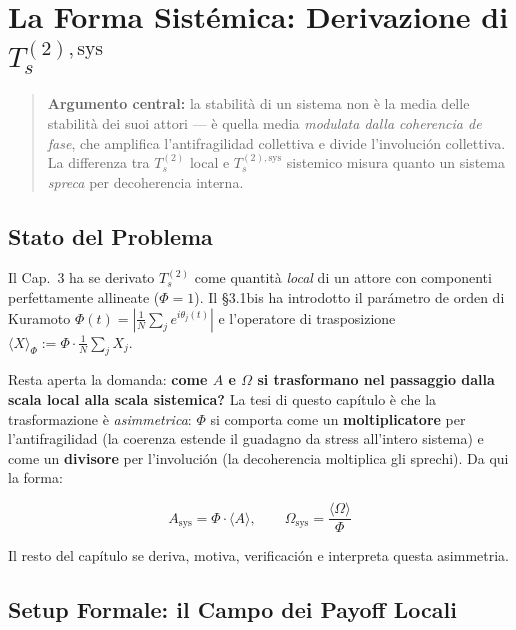 \chapter{\texorpdfstring{La Forma Sistémica: Derivazione di
\(T_s^{(2),\text{sys}}\)}{La Forma Sistémica: Derivazione di T\_s\^{}\{(2),\textbackslash text\{sys\}\}}}\label{la-forma-sistemica-se derivazione-di-t_s2textsys}

\begin{quote}
\textbf{Argumento central:} la stabilità di un sistema non è la media
delle stabilità dei suoi attori --- è quella media \emph{modulata dalla
coherencia de fase}, che amplifica l'antifragilidad collettiva e divide
l'involución collettiva. La differenza tra \(T_s^{(2)}\) local e
\(T_s^{(2),\text{sys}}\) sistemico misura quanto un sistema
\emph{spreca} per decoherencia interna.
\end{quote}



\section{Stato del Problema}\label{stato-del-problema}

Il Cap.~3 ha se derivato \(T_s^{(2)}\) come quantità \emph{local} di un
attore con componenti perfettamente allineate (\(\Phi = 1\)). Il \S{}3.1bis
ha introdotto il parámetro de orden di Kuramoto
\(\Phi(t) = \left|\frac{1}{N}\sum_j e^{i\theta_j(t)}\right|\) e
l'operatore di trasposizione
\(\langle X \rangle_\Phi := \Phi \cdot \frac{1}{N}\sum_j X_j\).

Resta aperta la domanda: \textbf{come \(A\) e \(\Omega\) si trasformano
nel passaggio dalla scala local alla scala sistemica?} La tesi di
questo capítulo è che la trasformazione è \emph{asimmetrica}: \(\Phi\)
si comporta come un \textbf{moltiplicatore} per l'antifragilidad (la
coerenza estende il guadagno da stress all'intero sistema) e come un
\textbf{divisore} per l'involución (la decoherencia moltiplica gli
sprechi). Da qui la forma:

\[
A_{\text{sys}} = \Phi \cdot \langle A \rangle, \qquad \Omega_{\text{sys}} = \frac{\langle \Omega \rangle}{\Phi}
\]

Il resto del capítulo se deriva, motiva, verificación e interpreta questa
asimmetria.



\section{Setup Formale: il Campo dei Payoff
Locali}\label{setup-formal-il-campo-dei-payoff-locali}

